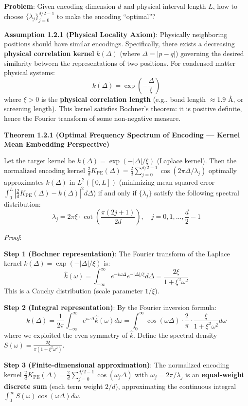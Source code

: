 \documentclass[
  12pt,
]{article}
\begin{document}
\textbf{Problem}: Given encoding dimension $d$ and physical interval length $L$, how to choose $\{\lambda_j\}_{j=0}^{d/2-1}$ to make the encoding ``optimal''?

\textbf{Assumption 1.2.1 (Physical Locality Axiom)}: Physically neighboring positions should have similar encodings. Specifically, there exists a decreasing \textbf{physical correlation kernel} $k(\Delta)$ (where $\Delta = |p-q|$) governing the desired similarity between the representations of two positions. For condensed matter physical systems:
\[k(\Delta) = \exp\left(-\frac{\Delta}{\xi}\right)\]
where $\xi > 0$ is the \textbf{physical correlation length} (e.g., bond length $\approx 1.9$ \AA, or screening length). This kernel satisfies Bochner's theorem: it is positive definite, hence the Fourier transform of some non-negative measure.

\textbf{Theorem 1.2.1 (Optimal Frequency Spectrum of Encoding --- Kernel Mean Embedding Perspective)}

Let the target kernel be $k(\Delta) = \exp(-|\Delta|/\xi)$ (Laplace kernel). Then the normalized encoding kernel $\frac{2}{d}K_{\text{PE}}(\Delta) = \frac{2}{d}\sum_{j=0}^{d/2-1} \cos(2\pi\Delta/\lambda_j)$ optimally approximates $k(\Delta)$ in $L^2([0, L])$ (minimizing mean squared error $\int_0^L |\frac{2}{d}K_{\text{PE}}(\Delta) - k(\Delta)|^2 d\Delta$) if and only if $\{\lambda_j\}$ satisfy the following spectral distribution:
\[\boxed{\lambda_j = 2\pi\xi \cdot \cot\left(\frac{\pi(2j+1)}{2d}\right), \quad j = 0, 1, \ldots, \frac{d}{2}-1}\]

\emph{Proof}:

\textbf{Step 1 (Bochner representation)}: The Fourier transform of the Laplace kernel $k(\Delta) = \exp(-|\Delta|/\xi)$ is:
\[\hat{k}(\omega) = \int_{-\infty}^{\infty} e^{-i\omega\Delta} e^{-|\Delta|/\xi} d\Delta = \frac{2\xi}{1 + \xi^2\omega^2}\]
This is a Cauchy distribution (scale parameter $1/\xi$).

\textbf{Step 2 (Integral representation)}: By the Fourier inversion formula:
\[k(\Delta) = \frac{1}{2\pi} \int_{-\infty}^{\infty} e^{i\omega\Delta} \hat{k}(\omega) d\omega = \int_{0}^{\infty} \cos(\omega\Delta) \cdot \frac{2}{\pi} \cdot \frac{\xi}{1 + \xi^2\omega^2} d\omega\]
where we exploited the even symmetry of $\hat{k}$. Define the spectral density $S(\omega) = \frac{2\xi}{\pi(1 + \xi^2\omega^2)}$.

\textbf{Step 3 (Finite-dimensional approximation)}: The normalized encoding kernel $\frac{2}{d}K_{\text{PE}}(\Delta) = \frac{2}{d}\sum_{j=0}^{d/2-1} \cos(\omega_j \Delta)$ with $\omega_j = 2\pi/\lambda_j$ is an \textbf{equal-weight discrete sum} (each term weight $2/d$), approximating the continuous integral $\int_0^{\infty} S(\omega)\cos(\omega\Delta)d\omega$.
\end{document}
